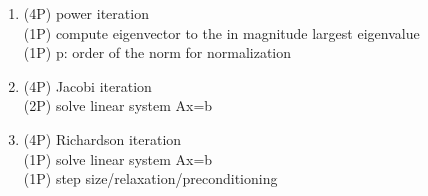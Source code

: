 {\color{solution}
\begin{enumerate}
\item \textcolor{exampoints}{(4P)} power iteration\\
\textcolor{exampoints}{(1P)} compute eigenvector to the in magnitude largest eigenvalue\\
\textcolor{exampoints}{(1P)} p: order of the norm for normalization
\item \textcolor{exampoints}{(4P)} Jacobi iteration\\
\textcolor{exampoints}{(2P)} solve linear system Ax=b
\item \textcolor{exampoints}{(4P)} Richardson iteration\\
\textcolor{exampoints}{(1P)}  solve linear system Ax=b\\
\textcolor{exampoints}{(1P)} step size/relaxation/preconditioning
\end{enumerate}
}
